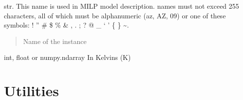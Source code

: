 \documentclass[letterpaper,10pt,english]{sphinxmanual}
\begin{document}
\begin{fulllineitems}
\begin{fulllineitems}
\end{fulllineitems}


\begin{fulllineitems}
\label{\detokenize{generated/tamos.element.ThermalVector:tamos.element.ThermalVector.name}}
\pysigstartsignatures
{}
\pysigstopsignatures
\sphinxAtStartPar
str.
This name is used in MILP model description.
names must not exceed 255 characters,
all of which must be alphanumeric (a\sphinxhyphen{}z, A\sphinxhyphen{}Z, 0\sphinxhyphen{}9) or one of these symbols:
! ” \# \$ \% \& , . ; ? @ \_ ‘ ’ \{ \} \textasciitilde{}.
\begin{quote}\begin{description}
\sphinxAtStartPar
Name of the instance

\end{description}\end{quote}

\end{fulllineitems}


\begin{fulllineitems}
\label{\detokenize{generated/tamos.element.ThermalVector:tamos.element.ThermalVector.temperature}}
\pysigstartsignatures
{}
\pysigstopsignatures
\sphinxAtStartPar
int, float or numpy.ndarray
In Kelvins (K)

\end{fulllineitems}


\end{fulllineitems}



\section{Utilities}
\label{\detokenize{element:utilities}}
\end{document}
